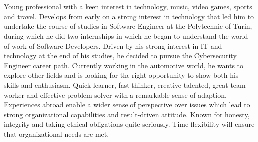 \documentclass[]{twentysecondcv}
\begin{document}
\vspace{-5pt}
\section{ \raisedrule[0\baselineskip]{1pt}\circled{}}
\vspace{-10pt}
Young professional with a keen interest in technology, music, video games, sports and travel. Develops from early on a strong interest in technology that led him to undertake the course of studies in Software Engineer at the Polytechnic of Turin, during which he did two internships in which he began to understand the world of work of Software Developers. Driven by his strong interest in IT and technology at the end of his studies, he decided to pursue the Cybersecurity Engineer career path. Currently working in the automotive world, he wants to explore other fields and is looking for the right opportunity to show both his skills and enthusiasm. Quick learner, fast thinker, creative talented, great team worker and effective problem solver with a remarkable sense of adaption. Experiences abroad enable a wider sense of perspective over issues which lead to strong organizational capabilities and result-driven attitude. Known for honesty, integrity and taking ethical obligations quite seriously. Time flexibility will ensure that organizational needs are met.
\end{document}

